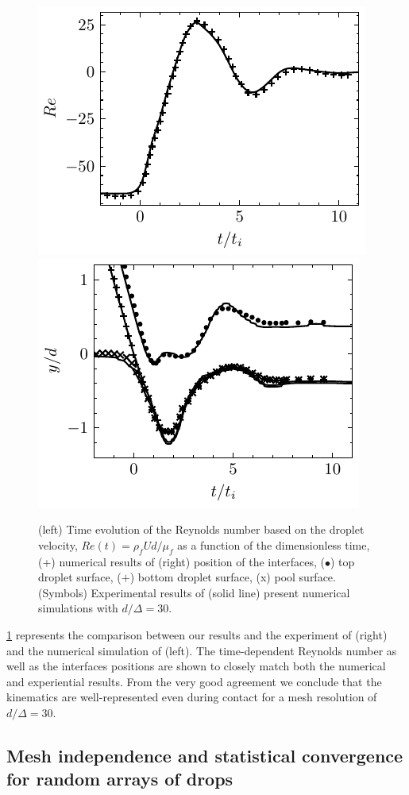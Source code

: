 \begin{figure}[h!]
    \centering
    \includegraphics[height = 0.3\textwidth]{image/VALIDATION2.0/Longmire/Re.pdf}
    \includegraphics[height = 0.3\textwidth]{image/VALIDATION2.0/Longmire/Dist.pdf}
    \caption{(left) Time evolution of the Reynolds number based on the droplet velocity, $Re(t) = \rho_fU d /\mu_f$ as a function of the dimensionless time, (+) numerical results of  \citet{balcazar2015multiple} (right)  position of the interfaces, ($\bullet$) top droplet surface, ($+$) bottom droplet surface, (x) pool surface. (Symbols) Experimental results of \citet{mohamed2003drop} (solid line) present numerical simulations with $d/\Delta = 30$. }
    \label{fig:resultslong}
\end{figure}
\ref{fig:resultslong} represents the comparison between our results and the experiment of \citet{mohamed2003drop} (right) and the numerical simulation of \citet{balcazar2015multiple} (left). 
The time-dependent Reynolds number as well as the interfaces positions are shown to closely match both the numerical and experiential results. 
From the very good agreement we conclude that the kinematics are well-represented even during contact for a mesh resolution of $d/\Delta = 30$.

\subsection*{Mesh independence and statistical convergence for random arrays of drops}

